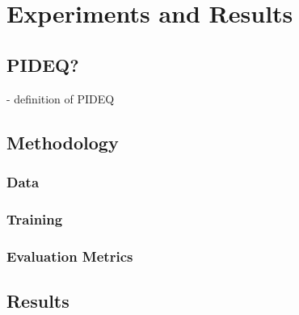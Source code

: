 \chapter{Experiments and Results}\label{ch:experiments}

\section{PIDEQ?}

- definition of PIDEQ

\section{Methodology}

\subsection{Data}

\subsection{Training}

\subsection{Evaluation Metrics}

\section{Results}

